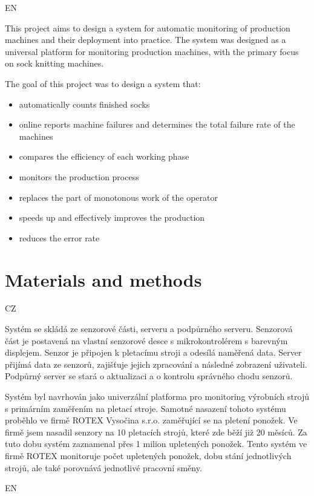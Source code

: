 \documentclass[12pt, a4paper]{article}
\begin{document}
EN

This project aims to design a system for automatic monitoring of production machines and their deployment into practice.
The system was designed as a universal platform for monitoring production machines, with the primary focus on sock knitting machines.

The goal of this project was to design a system that:

\begin{itemize}
    \item automatically counts finished socks
    \item online reports machine failures and determines the total failure rate of the machines
    \item compares the efficiency of each working phase
    \item monitors the production process
    \item replaces the part of monotonous work of the operator
    \item speeds up and effectively improves the production
    \item reduces the error rate
\end{itemize}


\section*{Materials and methods}
CZ

Systém se skládá ze senzorové části, serveru a podpůrného serveru.
Senzorová část je postavená na vlastní senzorové desce s mikrokontrolérem s barevným displejem.
Senzor je připojen k pletacímu stroji a odesílá naměřená data.
Server přijímá  data ze senzorů, zajišťuje jejich zpracování a následné zobrazení uživateli.
Podpůrný server se stará o aktualizaci a o kontrolu správného chodu senzorů.

Systém byl navrhován jako univerzální platforma pro monitoring výrobních strojů s primárním zaměřením na pletací stroje.
Samotné nasazení tohoto systému proběhlo ve firmě ROTEX Vysočina s.r.o. zaměřující se na pletení ponožek.
Ve firmě jsem nasadil senzory na 10 pletacích strojů, které zde běží již 20 měsíců.
Za tuto dobu systém zaznamenal přes 1 milion upletených ponožek.
Tento systém ve firmě ROTEX monitoruje počet upletených ponožek, dobu stání jednotlivých strojů, ale také porovnává jednotlivé pracovní směny.

EN
\end{document}
